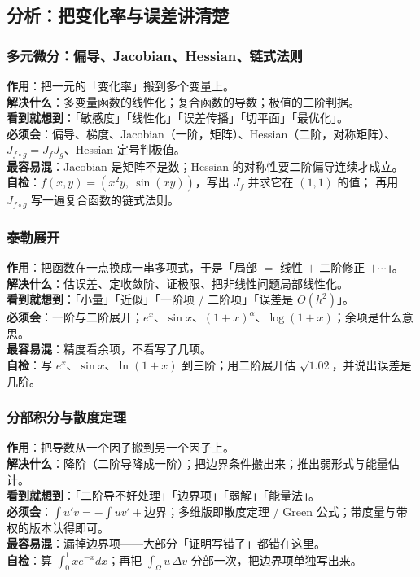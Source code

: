 \subsection{分析：把变化率与误差讲清楚}
\label{app:ana}

\subsubsection*{多元微分：偏导、Jacobian、Hessian、链式法则}
\textbf{作用}：把一元的「变化率」搬到多个变量上。\\
\textbf{解决什么}：多变量函数的线性化；复合函数的导数；极值的二阶判据。\\
\textbf{看到就想到}：「敏感度」「线性化」「误差传播」「切平面」「最优化」。\\
\textbf{必须会}：偏导、梯度、Jacobian（一阶，矩阵）、Hessian（二阶，对称矩阵）、$J_{f\circ g}=J_fJ_g$、Hessian 定号判极值。\\
\textbf{最容易混}：Jacobian 是矩阵不是数；Hessian 的对称性要二阶偏导连续才成立。\\
\textbf{自检}：$f(x,y)=(x^{2}y,\ \sin(xy))$，写出 $J_f$ 并求它在 $(1,1)$ 的值；
再用 $J_{f\circ g}$ 写一遍复合函数的链式法则。

\subsubsection*{泰勒展开}
\textbf{作用}：把函数在一点换成一串多项式，于是「局部 $=$ 线性 $+$ 二阶修正 $+\cdots$」。\\
\textbf{解决什么}：估误差、定收敛阶、证极限、把非线性问题局部线性化。\\
\textbf{看到就想到}：「小量」「近似」「一阶项 / 二阶项」「误差是 $O(h^{2})$」。\\
\textbf{必须会}：一阶与二阶展开；$e^{x}$、$\sin x$、$(1+x)^{\alpha}$、$\log(1+x)$；余项是什么意思。\\
\textbf{最容易混}：精度看余项，不看写了几项。\\
\textbf{自检}：写 $e^{x}$、$\sin x$、$\ln(1+x)$ 到三阶；用二阶展开估 $\sqrt{1.02}$，并说出误差是几阶。

\subsubsection*{分部积分与散度定理}
\textbf{作用}：把导数从一个因子搬到另一个因子上。\\
\textbf{解决什么}：降阶（二阶导降成一阶）；把边界条件搬出来；推出弱形式与能量估计。\\
\textbf{看到就想到}：「二阶导不好处理」「边界项」「弱解」「能量法」。\\
\textbf{必须会}：$\int u'v=-\int uv'+\text{边界}$；多维版即散度定理 / Green 公式；带度量与带权的版本认得即可。\\
\textbf{最容易混}：漏掉边界项——大部分「证明写错了」都错在这里。\\
\textbf{自检}：算 $\int_0^1 xe^{-x}dx$；再把 $\int_\Omega u\,\Delta v$ 分部一次，把边界项单独写出来。

